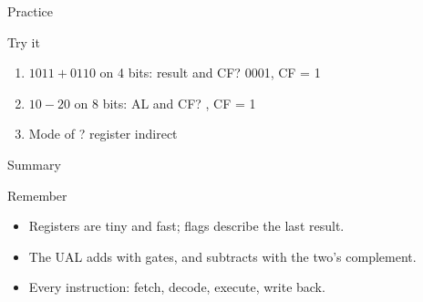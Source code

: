 \documentclass[aspectratio=169, 11pt, t, xcolor={table}]{beamer}
\begin{document}
\begin{frame}{Practice}
    \begin{obox}{\faEdit\quad Try it}
        \begin{enumerate}
            \item $1011 + 0110$ on 4 bits: result and CF? \hfill \textcolor{brandMuted}{0001, CF = 1}
            \item $10 - 20$ on 8 bits: AL and CF? \hfill \textcolor{brandMuted}{, CF = 1}
            \item Mode of ? \hfill \textcolor{brandMuted}{register indirect}
        \end{enumerate}
    \end{obox}
\end{frame}

\begin{frame}{Summary}
    \begin{tbox}{\faCheckCircle\quad Remember}
        \begin{itemize}
            \item Registers are tiny and fast; flags describe the last result.
            \item The UAL adds with gates, and subtracts with the two's complement.
            \item Every instruction: fetch, decode, execute, write back.
        \end{itemize}
    \end{tbox}
\end{frame}
\end{document}
